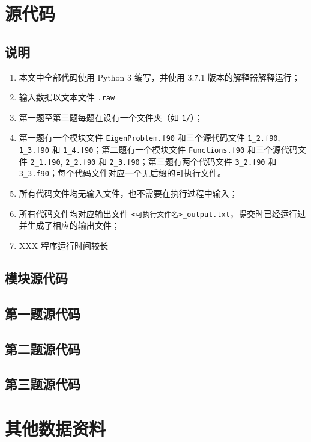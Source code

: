 \documentclass[18pt]{ctexart}
\begin{document}
\section{源代码}
\subsection{说明}
\begin{enumerate}
    \item 本文中全部代码使用 Python 3 编写，并使用 3.7.1 版本的解释器解释运行；
    \item 输入数据以文本文件 \verb|.raw| 
    \item 第一题至第三题每题在设有一个文件夹（如 \verb|1/|）；
    \item 第一题有一个模块文件 \verb|EigenProblem.f90| 和三个源代码文件 \verb|1_2.f90|, \verb|1_3.f90| 和 \verb|1_4.f90|；第二题有一个模块文件 \verb|Functions.f90| 和三个源代码文件 \verb|2_1.f90|, \verb|2_2.f90| 和 \verb|2_3.f90|；第三题有两个代码文件 \verb|3_2.f90| 和 \verb|3_3.f90|；每个代码文件对应一个无后缀的可执行文件。
    \item 所有代码文件均无输入文件，也不需要在执行过程中输入；
    \item 所有代码文件均对应输出文件 \verb|<可执行文件名>_output.txt|，提交时已经运行过并生成了相应的输出文件；
    \item XXX 程序运行时间较长
\end{enumerate}
\subsection{模块源代码}
\subsection{第一题源代码}
\subsection{第二题源代码}
\subsection{第三题源代码}
\newpage
\section{其他数据资料}
\end{document}
